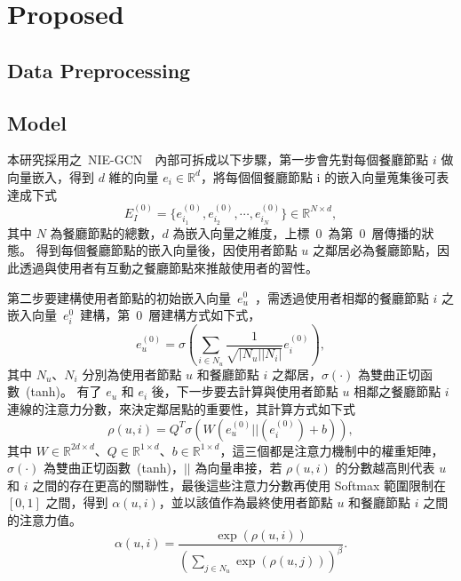 \section{Proposed}
\subsection{Data Preprocessing}
\subsection{Model}
\color{blue}
本研究採用之~NIE-GCN~\cite{NIE-GCN}~內部可拆成以下步驟，第一步會先對每個餐廳節點 $i$ 做向量嵌入，得到 $d$ 維的向量 $e_i \in \mathbb{R}^d$，將每個個餐廳節點 i 的嵌入向量蒐集後可表達成下式 
\begin{equation}
    E_I^{(0)} = \{e_{i_1}^{(0)}, e_{i_2}^{(0)},\cdots,e_{i_N}^{(0)}\} \in \mathbb{R}^{N \times d},
\end{equation}
其中 $N$ 為餐廳節點的總數，$d$ 為嵌入向量之維度，上標~$0$~為第~$0$~層傳播的狀態。
得到每個餐廳節點的嵌入向量後，因使用者節點 $u$ 之鄰居必為餐廳節點，因此透過與使用者有互動之餐廳節點來推敲使用者的習性。

第二步要建構使用者節點的初始嵌入向量~$e_u^{0}$~，需透過使用者相鄰的餐廳節點 $i$ 之嵌入向量~$e_i^{0}$~建構，第~$0$~層建構方式如下式，
\begin{equation}
    e_u^{(0)} = \sigma (\sum_{i \in N_u} \frac{1}{\sqrt{\vert N_u \vert \vert N_i \vert}}e_i^{(0)}),
\end{equation}
其中 $N_u$、$N_i$ 分別為使用者節點 $u$ 和餐廳節點 $i$ 之鄰居，$\sigma(\cdot)$ 為雙曲正切函數~(tanh)。
有了 $e_u$ 和 $e_i$ 後，下一步要去計算與使用者節點 $u$ 相鄰之餐廳節點 $i$ 連線的注意力分數，來決定鄰居點的重要性，其計算方式如下式
\begin{equation}
    \rho(u, i) = Q^T\sigma(W(e_u^{(0)}||(e_i^{(0)})+b)),
\end{equation}
其中 $W \in \mathbb{R}^{2d \times d}$、$Q \in \mathbb{R}^{1 \times d}$、$b \in \mathbb{R}^{1 \times d}$，這三個都是注意力機制中的權重矩陣，$\sigma(\cdot)$ 為雙曲正切函數~(tanh)，$||$ 為向量串接，若 $\rho(u, i)$ 的分數越高則代表 $u$ 和 $i$ 之間的存在更高的關聯性，最後這些注意力分數再使用 Softmax 範圍限制在 $[0,1]$ 之間，得到 $\alpha(u, i)$，並以該值作為最終使用者節點 $u$ 和餐廳節點 $i$ 之間的注意力值。
\begin{equation}
    \alpha(u, i) = \frac{\exp(\rho(u, i))}{(\sum_{j \in N_u}\exp(\rho(u, j)))^{\beta}}.
\end{equation}
\color{black}